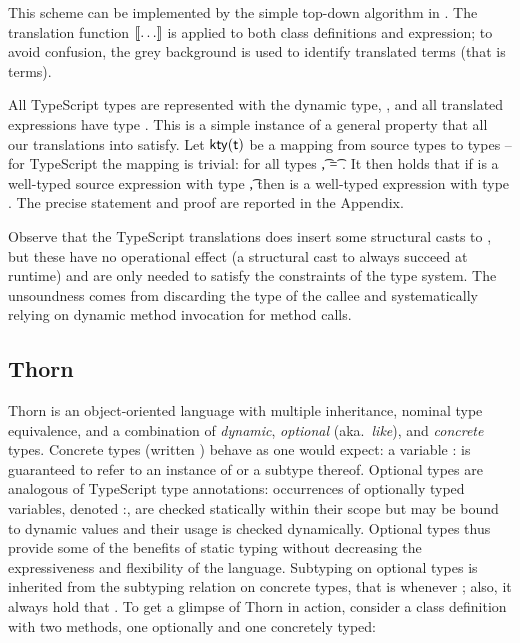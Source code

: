 \documentclass[acmlarge, anonymous, authordraft, review]{acmart} %
\begin{document}
\medskip
\noindent This  scheme can be implemented by the simple top-down algorithm in .  The translation function \(\llbracket \dots \rrbracket\) is applied to both class definitions and expression; to avoid confusion, the grey background is used to identify translated terms (that is \kafka terms).  


\begin{figure}[!h]
\end{figure}


\noindent  All TypeScript types are represented with the dynamic \kafka type, \any, and all translated expressions have type \any.  This is a simple instance of a general property that all our translations into \kafka satisfy.  Let \(\kty\t\) be a mapping from source types to \kafka types -- for TypeScript the mapping is trivial: for all types \t, \kty\t = \src{\any}.  It then holds that if \e is a well-typed source expression with type \t, then \TR{\e} is a well-typed \kafka expression with type \kty{\t}.  The precise statement and proof are reported in the Appendix.

Observe that the TypeScript translations does insert some structural casts to \any, but these have no operational effect (a structural cast to \any always succeed at runtime) and are only needed to satisfy the constraints of the \kafka type system.  The unsoundness comes from discarding the type of the callee and systematically relying on  dynamic method invocation for method calls.


\subsection{Thorn}

Thorn is an object-oriented language with multiple inheritance,
nominal type equivalence, and a combination of \emph{dynamic}, \emph{optional} (aka.~\emph{like}), and \emph{concrete} types.  Concrete types (written \C) behave as one would expect: a variable {\x:\C} is
guaranteed to refer to an instance of \C or a subtype thereof.  Optional types are analogous of TypeScript type annotations: occurrences of optionally typed variables, denoted {\x:\dt\C}, are checked statically within their scope but may be bound to dynamic values and their usage is checked dynamically.  Optional types thus provide some of the benefits of static typing without decreasing the expressiveness and flexibility of the language.  Subtyping on optional types is inherited from the subtyping relation on concrete types, that is {\dt\C} \Sub {\dt\D} whenever \C \Sub \D; also, it always hold that \C \Sub  \dt\C. To get a glimpse of Thorn in action, consider a class definition with two methods, one optionally and one concretely typed:
\end{document}
